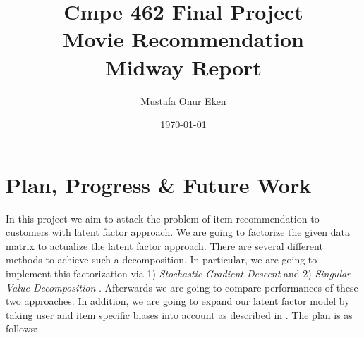 \documentclass[dvips,11pt]{article}
\begin{document}

\title{Cmpe 462 Final Project\\Movie Recommendation\\Midway Report}
\author{Mustafa Onur Eken}
\date{\today}



\maketitle
\section{Plan, Progress \& Future Work}

In this project we aim to attack the problem of item recommendation to customers with latent factor approach. We are going to factorize the given data matrix to actualize the latent factor approach. There are several different methods to achieve such a decomposition. In particular, we are going to implement this factorization via 1) \textit{Stochastic Gradient Descent} \cite{yehuda} and 2) \textit{Singular Value Decomposition} \cite{sarwar}. Afterwards we are going to compare performances of these two approaches. In addition, we are going to expand our latent factor model by taking user and item specific biases into account as described in \cite{yehuda}. The plan is as follows:
\end{document}
